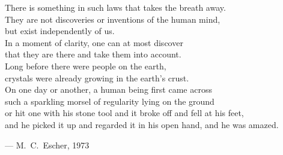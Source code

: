 \begin{flushright}
\begin{hangleftquote}{\QENOpen}{\QENClose}
There is something in such laws that takes the breath away.\\
They are not discoveries or inventions of the human mind,\\
but exist independently of us.\\
In a moment of clarity, one can at most discover\\
that they are there and take them into account.\\
Long before there were people on the earth,\\
crystals were already growing in the earth's crust.\\
On one day or another, a human being first came across\\
such a sparkling morsel of regularity lying on the ground\\
or hit one with his stone tool and it broke off and fell at his feet,\\
and he picked it up and regarded it in his open hand, and he was amazed.
\end{hangleftquote}
\par\smallskip
\normalfont — M.~C.~Escher, 1973
\end{flushright}

